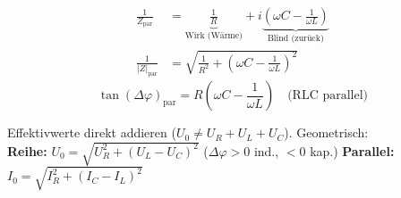 \begin{formulabox}
\[ \begin{aligned}
  \frac{1}{Z_{\mathrm{par}}} &= \underbrace{\frac{1}{R}}_{\text{Wirk (Wärme)}} + i\underbrace{\left(\omega C - \frac{1}{\omega L}\right)}_{\text{Blind (zurück)}} \\
  \frac{1}{|Z|_{\mathrm{par}}} &= \sqrt{\frac{1}{R^2} + \left(\omega C - \tfrac{1}{\omega L}\right)^2}
\end{aligned} \]
\[ \tan(\Delta\varphi)_{\mathrm{par}} = R\!\left(\omega C - \frac{1}{\omega L}\right) \quad \text{(RLC parallel)} \]
\end{formulabox}

\begin{warnbox}
Effektivwerte  direkt addieren ($U_0 \neq U_R + U_L + U_C$). Geometrisch:\\
\textbf{Reihe:} $U_0 = \sqrt{U_R^2 + (U_L - U_C)^2}$ ($\Delta\varphi > 0$ ind., $< 0$ kap.) \quad \textbf{Parallel:} $I_0 = \sqrt{I_R^2 + (I_C - I_L)^2}$
\end{warnbox}

